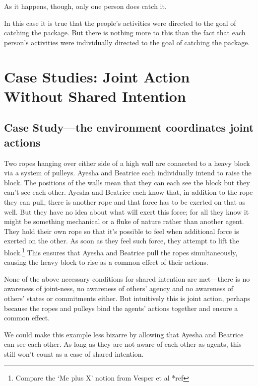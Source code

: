 \documentclass[12pt,a4paper]{extarticle}
\begin{document}
As it happens, though, only one person does catch it.

In this case it is true that the people's activities were directed to the goal of catching the package.  But there is nothing more to this than the fact that each person's activities were individually directed to the goal of catching the package.



\section{Case Studies: Joint Action Without Shared Intention}


\subsection{Case Study---the environment coordinates joint actions}

Two ropes hanging over either side of a high wall are connected to a heavy block via a system of pulleys.  Ayesha and Beatrice each individually intend to raise the block.  
The positions of the walls mean that they can each see the block but they can't see each other.
Ayesha and Beatrice each know that, in addition to the rope they can pull, there is another rope and that force has to be exerted on that as well.  
But they have no idea about what will exert this force; for all they know it might be something mechanical or a fluke of nature rather than another agent.
They hold their own rope so that it's possible to feel when additional force is exerted on the other.  As soon as they feel such force, they attempt to lift the block.\footnote{
Compare the `Me plus X' notion from Vesper et al *ref
} 
This ensures that Ayesha and Beatrice pull the ropes simultaneously, causing the heavy block to rise as a common effect of their actions. 

None of the above necessary conditions for shared intention are met---there is no awareness of joint-ness, no awareness of others' agency and no awareness of others' states or commitments either.  
But intuitively this is joint action, perhaps because the ropes and pulleys bind the agents' actions together and ensure a common effect.  

We could make this example less bizarre by allowing that Ayesha and Beatrice can see each other.  As long as they are not aware of each other as agents, this still won't count as a case of shared intention.  
\end{document}
